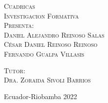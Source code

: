 \documentclass[12pt,a4paper]{article}
\begin{document}
\begin{titlepage}
\begin{minipage}[c][0.81\textheight][t]{0.75\textwidth}
\begin{center}
            {\large\scshape Cuadricas}\\[.2in]
            \vspace{2cm}
            \textsc{\large Investigacion Formativa}\\[0.5cm]
            \textsc{\large Presenta:}\\[0.5cm]
            \textsc{\large {Daniel Alejandro Reinoso Salas \\
                    César Daniel Reinoso Reinoso\\
                    Fernando Gualpa Villasis}}\\[2cm]

            \vspace{0.5cm}

             {\large\scshape Tutor:\\[0.3cm] {Dra.   Zoraida Sivoli Barrios }}\\[.2in]

            \vspace{0.5cm}

            \large{Ecuador-Riobamba }{2022}
        \end{center}
    \end{minipage}
\end{titlepage}
\tableofcontents
\listoffigures
\newpage

\newpage

\newpage


\end{document}
